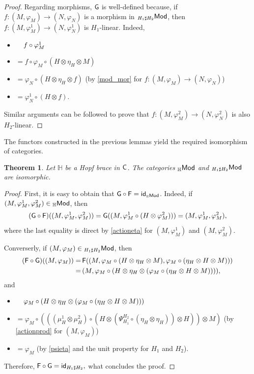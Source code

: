\documentclass[11pt,reqno]{amsart}
\theoremstyle{plain}%
\newtheorem{theorem}{Theorem}[section]%
\theoremstyle{definition}
\theoremstyle{remark}
\begin{document}
\begin{proof}
	Regarding morphisms, ${\sf G}$ is well-defined because, if $f\colon (M,\varphi_{M})\rightarrow (N,\varphi_{N})$ is a morphism in ${}_{H_{1}\sharp H_{2}}{\sf Mod}$, then 
	$f\colon (M,\varphi_{M}^{1})\rightarrow (N,\varphi_{N}^{1})$ is $H_{1}$-linear. Indeed,
	\begin{itemize}
		\itemindent=-32pt 
		\item[ ]$\hspace{0.38cm}f\circ\varphi_{M}^{1}$
		\item[]$=f\circ\varphi_{M}\circ(H\otimes\eta_{H}\otimes M)$
		\item[]$=\varphi_{N}\circ(H\otimes\eta_{H}\otimes f)$ {\footnotesize (by \eqref{mod_mor} for $f\colon (M,\varphi_{M})\rightarrow (N,\varphi_{N})$)}
		\item[]$=\varphi_{N}^{1}\circ (H\otimes f)$.
	\end{itemize}
	Similar arguments can be followed to prove that $f\colon (M,\varphi_{M}^{2})\rightarrow (N,\varphi_{N}^{2})$ is also $H_{2}$-linear.
\end{proof}
The functors constructed in the previous lemmas yield the required isomorphism of categories.
\begin{theorem}\label{mainth}
	Let $\mathbb{H}$ be a Hopf brace in ${\sf C}$. The categories ${}_{\mathbb{H}}{\sf Mod}$ and ${}_{H_{1}\sharp H_{2}}{\sf Mod}$ are isomorphic.
\end{theorem}
\begin{proof}
	First, it is easy to obtain that ${\sf G}\circ{\sf F}={\sf id}_{{}_{\mathbb{H}}{\sf Mod}}$. Indeed, if $(M,\varphi_{M}^{1},\varphi_{M}^{2})\in{}_{\mathbb{H}}{\sf Mod}$, then
	\[({\sf G}\circ{\sf F})((M,\varphi_{M}^{1},\varphi_{M}^{2}))={\sf G}((M,\varphi_{M}^{1}\circ(H\otimes\varphi_{M}^{2})))=(M,\varphi_{M}^{1},\varphi_{M}^{2}),\]
	where the last equality is direct by \eqref{actioneta} for $(M,\varphi_{M}^{1})$ and $(M,\varphi_{M}^{2})$.
	
	Converserly, if $(M,\varphi_{M})\in{}_{H_{1}\sharp H_{2}}{\sf Mod}$, then
	\begin{align*}
		({\sf F}\circ{\sf G})((M,\varphi_{M}))=\,&{\sf F}((M,\varphi_{M}\circ(H\otimes\eta_{H}\otimes M),\varphi_{M}\circ(\eta_{H}\otimes H\otimes M)))\\=\,&(M,\varphi_{M}\circ(H\otimes\eta_{H}\otimes(\varphi_{M}\circ(\eta_{H}\otimes H\otimes M)))),
	\end{align*}
	and
	\begin{itemize}
		\itemindent=-32pt 
		\item[ ]$\hspace{0.38cm}\varphi_{M}\circ(H\otimes\eta_{H}\otimes(\varphi_{M}\circ(\eta_{H}\otimes H\otimes M)))$
		\item[]$=\varphi_{M}\circ(((\mu_{H}^{1}\otimes\mu_{H}^{2})\circ(H\otimes(\Psi^{H_{2}}_{H_{1}}\circ(\eta_{H}\otimes\eta_{H}))\otimes H))\otimes M)$ {\footnotesize (by \eqref{actionprod} for $(M,\varphi_{M})$)}
		\item[]$=\varphi_{M}$ {\footnotesize (by \eqref{psieta} and the unit property for $H_{1}$ and $H_{2}$)}.
	\end{itemize}
	Therefore, ${\sf F}\circ{\sf G}={\sf id}_{H_{1}\sharp H_{2}},$ what concludes the proof.
\end{proof}
\end{document}
